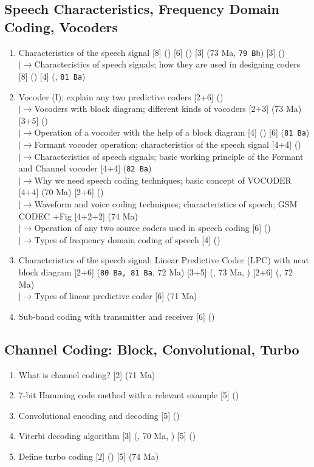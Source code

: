 \documentclass[12pt]{article}
\newcommand{\lb}{\\$\left|\rightarrow\right.$}
\begin{document}
  \subsection{Speech Characteristics, Frequency Domain Coding, Vocoders}
    \begin{enumerate}[topsep=0pt, noitemsep]
      \item Characteristics of the speech signal
        \hfill [8] () [6] () [3] (73 Ma, \texttt{79 Bh}) [3] ()
        \lb Characteristics of speech signals; how they are used in designing coders \hfill [8] () [4] (, \texttt{81 Ba})
      \item Vocoder (I); explain any two predictive coders \hfill [2+6] ()
        \lb Vocoders with block diagram; different kinds of vocoders \hfill [2+3] (73 Ma) [3+5] ()
        \lb Operation of a vocoder with the help of a block diagram \hfill [4] () [6] (\texttt{81 Ba})
        \lb Formant vocoder operation; characteristics of the speech signal \hfill [4+4] ()
        \lb Characteristics of speech signals; basic working principle of the Formant and
        Channel vocoder \hfill [4+4] (\texttt{82 Ba})
        \lb Why we need speech coding techniques; basic concept of VOCODER \hfill [4+4] (70 Ma) [2+6] ()
        \lb Waveform and voice coding techniques; characteristics of speech;
        GSM CODEC +Fig \hfill [4+2+2] (74 Ma)
        \lb Operation of any two source coders used in speech coding \hfill [6] ()
        \lb Types of frequency domain coding of speech \hfill [4] ()
      \item Characteristics of the speech signal; Linear Predictive Coder (LPC)
        with neat block diagram \hfill [2+6] (\texttt{80 Ba, 81 Ba}, 72 Ma) [3+5] (, 73 Ma, ) [2+6] (, 72 Ma)
        \lb Types of linear predictive coder \hfill [6] (71 Ma)
      \item Sub-band coding with transmitter and receiver \hfill [6] ()
    \end{enumerate}

  \subsection{Channel Coding: Block, Convolutional, Turbo}
    \begin{enumerate}[topsep=0pt, noitemsep]
      \item What is channel coding? \hfill [2] (71 Ma)
      \item 7-bit Hamming code method with a relevant example \hfill [5] ()
      \item Convolutional encoding and decoding \hfill [5] ()
      \item Viterbi decoding algorithm \hfill [3] (, 70 Ma, ) [5] ()
      \item Define turbo coding \hfill [2] () [5] (74 Ma)
    \end{enumerate}
\end{document}
